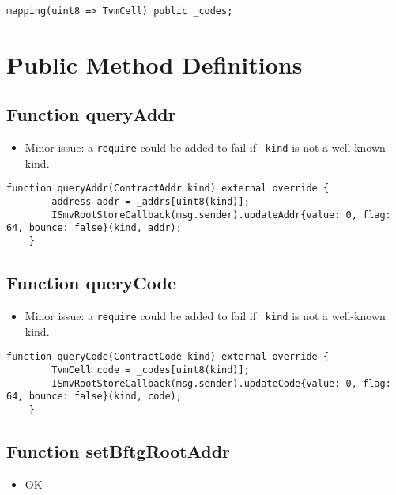 \begin{lstlisting}[firstnumber=11]
    mapping(uint8 => TvmCell) public _codes;
\end{lstlisting}

\section{Public Method Definitions}


\subsection{Function queryAddr}

\begin{itemize}
\item Minor issue: a {\tt require} could be added to fail if {\tt
  kind} is not a well-known kind.
\end{itemize}

\begin{lstlisting}[firstnumber=36]
    function queryAddr(ContractAddr kind) external override {
        address addr = _addrs[uint8(kind)];
        ISmvRootStoreCallback(msg.sender).updateAddr{value: 0, flag: 64, bounce: false}(kind, addr);
    }
\end{lstlisting}

\subsection{Function queryCode}

\begin{itemize}
\item Minor issue: a {\tt require} could be added to fail if {\tt
  kind} is not a well-known kind.
\end{itemize}

\begin{lstlisting}[firstnumber=31]
    function queryCode(ContractCode kind) external override {
        TvmCell code = _codes[uint8(kind)];
        ISmvRootStoreCallback(msg.sender).updateCode{value: 0, flag: 64, bounce: false}(kind, code);
    }
\end{lstlisting}

\subsection{Function setBftgRootAddr}

\begin{itemize}
\item OK
\end{itemize}

